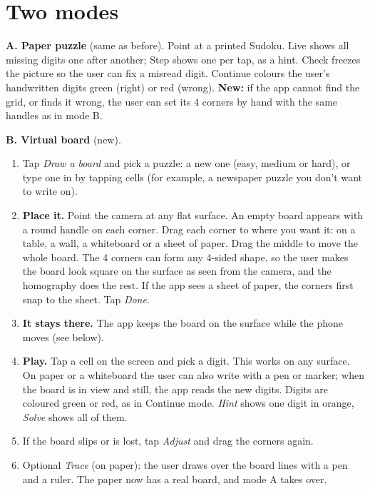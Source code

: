\documentclass[11pt]{article}
\begin{document}
\section{Two modes}\label{sec:modes}

\textbf{A. Paper puzzle} (same as before). Point at a printed Sudoku. Live shows all missing
digits one after another; Step shows one per tap, as a hint. Check freezes the picture so the user
can fix a misread digit. Continue colours the user's handwritten digits green (right) or red
(wrong). \textbf{New:} if the app cannot find the grid, or finds it wrong, the user can set its 4
corners by hand with the same handles as in mode B.

\textbf{B. Virtual board} (new).
\begin{enumerate}
  \item Tap \emph{Draw a board} and pick a puzzle: a new one (easy, medium or hard), or type one in
        by tapping cells (for example, a newspaper puzzle you don't want to write on).
  \item \textbf{Place it.} Point the camera at any flat surface. An empty board appears with a
        round handle on each corner. Drag each corner to where you want it: on a table, a wall, a
        whiteboard or a sheet of paper. Drag the middle to move the whole board. The 4 corners can
        form any 4-sided shape, so the user makes the board look square on the surface as seen
        from the camera, and the homography does the rest. If the app sees a sheet of paper, the
        corners first snap to the sheet. Tap \emph{Done}.
  \item \textbf{It stays there.} The app keeps the board on the surface while the phone moves
        (see below).
  \item \textbf{Play.} Tap a cell on the screen and pick a digit. This works on any surface. On
        paper or a whiteboard the user can also write with a pen or marker; when the board is in
        view and still, the app reads the new digits. Digits are coloured green or red, as in
        Continue mode. \emph{Hint} shows one digit in orange, \emph{Solve} shows all of them.
  \item If the board slips or is lost, tap \emph{Adjust} and drag the corners again.
  \item Optional \emph{Trace} (on paper): the user draws over the board lines with a pen and a
        ruler. The paper now has a real board, and mode A takes over.
\end{enumerate}
\end{document}
